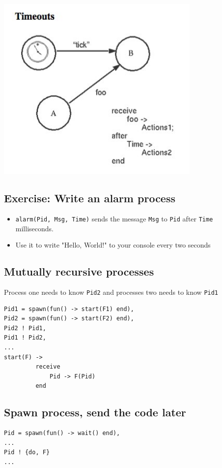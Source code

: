 \documentclass[12pt]{article}
\begin{document}
\begin{itemize}
\includegraphics[width=10cm]{images/tick.jpg}

\subsection{Exercise: Write an alarm process}

\begin{itemize}
\item \verb+alarm(Pid, Msg, Time)+ sends the message \verb+Msg+ to
  \verb+Pid+ after \verb+Time+ milliseconds.
\item Use it to write "Hello, World!" to your console every two
  seconds
\end{itemize}


\subsection{Mutually recursive processes}

Process one needs to know \verb+Pid2+ and processes two needs to know
\verb+Pid1+

\begin{verbatim}
Pid1 = spawn(fun() -> start(F1) end),
Pid2 = spawn(fun() -> start(F2) end),
Pid2 ! Pid1,
Pid1 ! Pid2,
...
start(F) ->
         receive
             Pid -> F(Pid)
         end
\end{verbatim}

\subsection{Spawn process, send the code later}

\begin{verbatim}
Pid = spawn(fun() -> wait() end),
...
Pid ! {do, F}
...


\end{verbatim}
\end{itemize}
\end{document}
